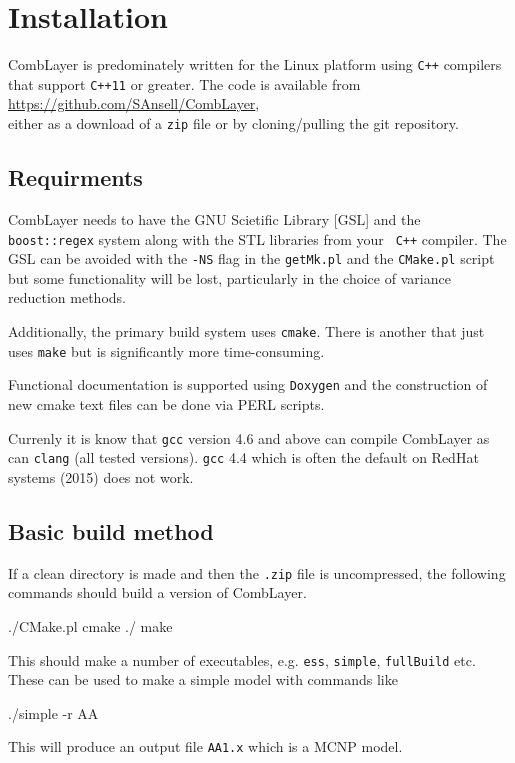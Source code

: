 \section{Installation}

CombLayer is predominately written for the Linux platform using {\tt C++}
compilers that support {\tt C++11} or greater. The code is available from \\
\href{https://github.com/SAnsell/CombLayer}{https://github.com/SAnsell/CombLayer}, \\ either as a download of a {\tt zip} file or
by cloning/pulling the git repository.

\subsection{Requirments}

CombLayer needs to have the GNU Scietific Library [GSL] and the {\tt
  boost::regex} system along with the STL libraries from your {\tt
  C++} compiler. The GSL can be avoided with the {\tt -NS} flag in the
{\tt getMk.pl} and the {\tt CMake.pl} script but some functionality will be
lost, particularly in the choice of variance reduction methods.

Additionally, the primary build system uses {\tt cmake}. There is another
that just uses {\tt make} but is significantly more time-consuming.

Functional documentation is supported using {\tt Doxygen} and the construction
of new cmake text files can be done via PERL scripts.

Currenly it is know that {\tt gcc} version 4.6 and above can compile
CombLayer as can {\tt clang} (all tested versions). {\tt gcc} 4.4 which is often
the default on RedHat systems (2015) does not work.

\subsection{Basic build method}

If a clean directory is made and then the {\tt .zip} file is uncompressed, the
following commands should build a version of CombLayer.

\begin{bash}
  ./CMake.pl
  cmake ./
  make
\end{bash}

This should make a number of executables, e.g. {\tt ess}, {\tt simple}, {\tt fullBuild} etc. These
can be used to make a simple model with commands like
\begin{bash}
  ./simple -r AA
\end{bash}
This will produce an output file {\tt AA1.x} which is a MCNP model.



